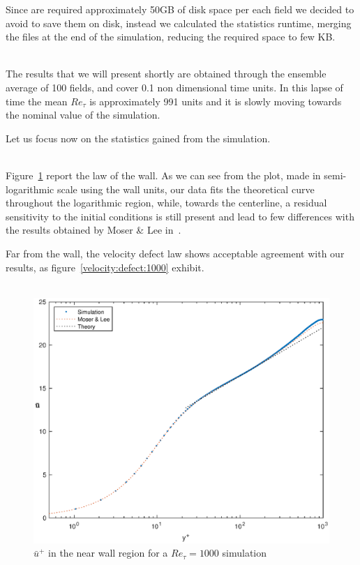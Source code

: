 Since are required approximately 50GB of disk space per each field we decided to avoid to save them on disk, instead we calculated the statistics runtime, merging the files at the end of the simulation, reducing the required space to few KB.\\~\par

The results that we will present shortly are obtained through the ensemble average of 100 fields, and cover 0.1 non dimensional time units. In this lapse of time the mean $Re_{\tau}$ is approximately 991 units and it is slowly moving towards the nominal value of the simulation.\par
Let us focus now on the statistics gained from the simulation.\\~\par
Figure~\ref{loglaw:1000} report the law of the wall. As we can see from the plot, made in semi-logarithmic scale using the wall units, our data fits the theoretical curve throughout the logarithmic region, while, towards the centerline, a residual sensitivity to the initial conditions is still present and lead to few differences with the results obtained by Moser \& Lee in~\cite{Lee}.\par
Far from the wall, the velocity defect law shows acceptable agreement with our results, as figure~\ref{velocity:defect:1000} exhibit.\\~\par

\begin{figure}
\begin{center}
\includegraphics[scale=0.55]{grafici/loglaw_1000.eps}
\caption{$\bar{u}^{+}$ in the near wall region for a $Re_{\tau}=1000$ simulation}
\label{loglaw:1000}
\end{center} 
\end{figure}

